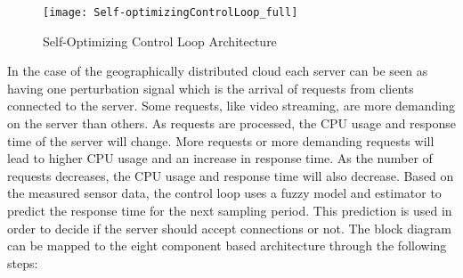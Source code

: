 \begin{figure}
	\centering
	\texttt{[image: Self-optimizingControlLoop\_full]}
	\caption{Self-Optimizing Control Loop Architecture}
	\label{fig:selfopt-archi}
\end{figure}

In the case of the geographically distributed cloud each server can be seen as having one perturbation signal which is the arrival of requests from clients connected to the server. Some requests, like video streaming, are more demanding on the server than others. As requests are processed, the CPU usage and response time of the server will change. More requests or more demanding requests will lead to higher CPU usage and an increase in response time. As the number of requests decreases, the CPU usage and response time will also decrease. Based on the measured sensor data, the control loop uses a fuzzy model and estimator to predict the response time for the next sampling period. This prediction is used in order to decide if the server should accept connections or not. The block diagram can be mapped to the eight component based architecture through the following steps:

